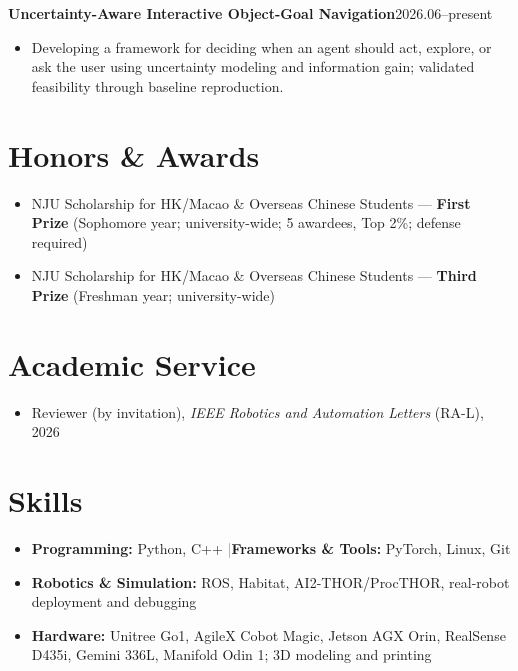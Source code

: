 \documentclass[11pt,a4paper]{article}
\newcommand{\sep}{\hspace{0.5em}\textcolor{gray}{|}\hspace{0.5em}}
\newcommand{\project}[2]{\textbf{#1}\hfill #2\\[-1pt]}
\begin{document}
\project{Uncertainty-Aware Interactive Object-Goal Navigation}{2026.06--present}
\begin{itemize}
  \item Developing a framework for deciding when an agent should act, explore, or ask the user using uncertainty modeling and information gain; validated feasibility through baseline reproduction.
\end{itemize}

\section{Honors \& Awards}
\begin{itemize}
  \item NJU Scholarship for HK/Macao \& Overseas Chinese Students --- \textbf{First Prize} (Sophomore year; university-wide; 5 awardees, Top 2\%; defense required)
  \item NJU Scholarship for HK/Macao \& Overseas Chinese Students --- \textbf{Third Prize} (Freshman year; university-wide)
\end{itemize}

\section{Academic Service}
\begin{itemize}
  \item Reviewer (by invitation), \textit{IEEE Robotics and Automation Letters} (RA-L), 2026
\end{itemize}

\section{Skills}
\begin{itemize}
  \item \textbf{Programming:} Python, C++ \sep \textbf{Frameworks \& Tools:} PyTorch, Linux, Git
  \item \textbf{Robotics \& Simulation:} ROS, Habitat, AI2-THOR/ProcTHOR, real-robot deployment and debugging
  \item \textbf{Hardware:} Unitree Go1, AgileX Cobot Magic, Jetson AGX Orin, RealSense D435i, Gemini 336L, Manifold Odin 1; 3D modeling and printing
\end{itemize}
\end{document}
